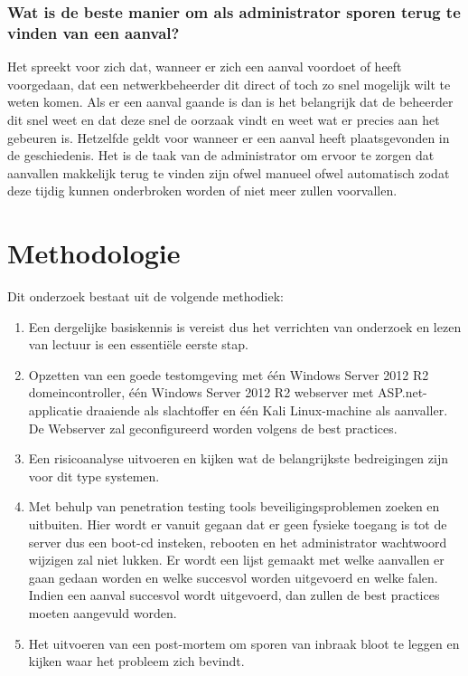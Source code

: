\documentclass[pdftex,a4paper,12pt]{report}
\begin{document}
\subsection{Wat is de beste manier om als administrator sporen terug te vinden van een aanval?}

Het spreekt voor zich dat, wanneer er zich een aanval voordoet of heeft voorgedaan, dat een netwerkbeheerder dit direct of toch zo snel mogelijk wilt te weten komen. Als er een aanval gaande is dan is het belangrijk dat de beheerder dit snel weet en dat deze snel de oorzaak vindt en weet wat er precies aan het gebeuren is. Hetzelfde geldt voor wanneer er een aanval heeft plaatsgevonden in de geschiedenis. Het is de taak van de administrator om ervoor te zorgen dat aanvallen makkelijk terug te vinden zijn ofwel manueel ofwel automatisch zodat deze tijdig kunnen onderbroken worden of niet meer zullen voorvallen.

\chapter{Methodologie}
\label{ch:methodologie}


Dit onderzoek bestaat uit de volgende methodiek:
\begin{enumerate}
	\item Een dergelijke basiskennis is vereist dus het verrichten van onderzoek en lezen van lectuur is een essentiële eerste stap.
	\item Opzetten van een goede testomgeving met één Windows Server 2012 R2 domeincontroller, één Windows Server 2012 R2 webserver met ASP.net-applicatie draaiende als slachtoffer en één Kali Linux-machine als aanvaller. De Webserver zal geconfigureerd worden volgens de best practices.
	\item Een risicoanalyse uitvoeren en kijken wat de belangrijkste bedreigingen zijn voor dit type systemen.
	\item Met behulp van penetration testing tools beveiligingsproblemen zoeken en uitbuiten. Hier wordt er vanuit gegaan dat er geen fysieke toegang is tot de server dus een boot-cd insteken, rebooten en het administrator wachtwoord wijzigen zal niet lukken. Er wordt een lijst gemaakt met welke aanvallen er gaan gedaan worden en welke succesvol worden uitgevoerd en welke falen. Indien een aanval succesvol wordt uitgevoerd, dan zullen de best practices moeten aangevuld worden.
	\item Het uitvoeren van een post-mortem om sporen van inbraak bloot te leggen en kijken waar het probleem zich bevindt.
\end{enumerate}
\end{document}
